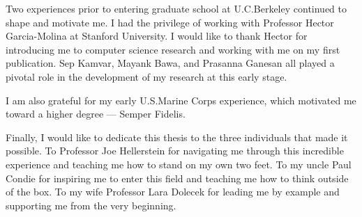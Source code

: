 Two experiences prior to entering graduate school at U.C.\@ Berkeley continued
to shape and motivate me.  I had the privilege of working with Professor Hector
Garcia-Molina at Stanford University.  I would like to thank Hector for
introducing me to computer science research and working with me on my first
publication.  Sep Kamvar, Mayank Bawa, and Prasanna Ganesan all played a
pivotal role in the development of my research at this early stage.  

I am also grateful for my early U.S.\@ Marine Corps experience, which motivated
me toward a higher degree --- Semper Fidelis.

Finally, I would like to dedicate this thesis to the three individuals that
made it possible.  To Professor Joe Hellerstein for navigating me through this
incredible experience and teaching me how to stand on my own two feet.  To my
uncle Paul Condie for inspiring me to enter this field and teaching me how to
think outside of the box.  To my wife Professor Lara Dolecek for leading me by
example and supporting me from the very beginning.


